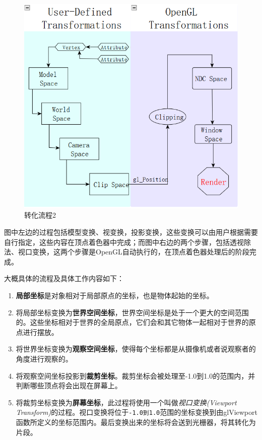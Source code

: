 \documentclass[UTF8,a4paper,12pt]{ctexbook}
\begin{document}
		\begin{figure}[H]
			\centering
			\includegraphics[scale = 0.9]{transferAll2.png}
			\caption{转化流程2}
		\end{figure}
		
		图中左边的过程包括模型变换、视变换，投影变换，这些变换可以由用户根据需要自行指定，这些内容在顶点着色器中完成；而图中右边的两个步骤，包括透视除法、视口变换，这两个步骤是OpenGL自动执行的，在顶点着色器处理后的阶段完成。
		
		大概具体的流程及具体工作内容如下：
		\begin{enumerate}[itemindent = 1em]
			\item \textbf{局部坐标}是对象相对于局部原点的坐标，也是物体起始的坐标。
			\item 将局部坐标变换为\textbf{世界空间坐标}，世界空间坐标是处于一个更大的空间范围的。这些坐标相对于世界的全局原点，它们会和其它物体一起相对于世界的原点进行摆放。
			\item 将世界坐标变换为\textbf{观察空间坐标}，使得每个坐标都是从摄像机或者说观察者的角度进行观察的。
			\item 将观察空间坐标投影到\textbf{裁剪坐标}。裁剪坐标会被处理至-1.0到1.0的范围内，并判断哪些顶点将会出现在屏幕上。
			\item 将裁剪坐标变换为\textbf{屏幕坐标}，此过程将使用一个叫做\textit{视口变换(Viewport Transform)}的过程。视口变换将位于\verb|-1.0到1.0|范围的坐标变换到由glViewport函数所定义的坐标范围内。最后变换出来的坐标将会送到光栅器，将其转化为片段。		
		\end{enumerate}
		
\end{document}
